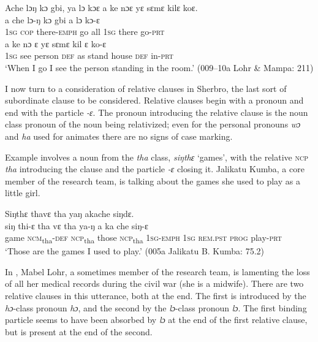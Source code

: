 \ea%
    \label{ex:236}
    Ache lɔŋ kɔ gbi, ya lɔ kɔɛ a ke nɔɛ yɛ sɛmɛ kilɛ koɛ.\\
    \gll a    che  lɔ-ŋ        kɔ     gbi    a    lɔ    kɔ-ɛ\\
    1\textsc{sg}  \textsc{cop}  there{}-\textsc{emph}    go    all      \textsc{1sg}  there  go-\textsc{prt}\\
    \gll a    ke    nɔ      ɛ    yɛ    sɛmɛ    kil      ɛ    ko-ɛ\\
    \textsc{1sg}  see  person  \textsc{def}  as    stand    house    \textsc{def}  in-\textsc{prt}\\
    \glt ‘When I go I see the person standing in the room.' (009--10a Lohr \& Mampa: 211)
\z

I now turn to a consideration of relative clauses in Sherbro, the last sort of subordinate clause to be considered. Relative clauses begin with a pronoun and end with the particle \textit{{}-ɛ}. The pronoun introducing the relative clause is the noun class pronoun of the noun being relativized; even for the personal pronouns \textit{wɔ} and \textit{ha} used for animates there are no signs of case marking.

Example  involves a noun from the \textit{tha} class, \textit{siŋthɛ} ‘games', with the relative \textsc{ncp} \textit{tha} introducing the clause and the particle \textit{{}-ɛ} closing it. Jalikatu Kumba, a core member of the research team, is talking about the games she used to play as a little girl.

\ea%
    \label{ex:237}
    Siŋthɛ thavɛ tha yaŋ   akache siŋdɛ.\\
    \gll siŋ    thi-ɛ      tha    vɛ    tha    ya-ŋ      a    ka      che  siŋ-ɛ\\
    game  \textsc{ncm}\textsubscript{tha}{}-\textsc{def}  \textsc{ncp}\textsubscript{tha}    those  \textsc{ncp}\textsubscript{tha}    \textsc{1sg-emph}  1\textsc{sg}  \textsc{rem.pst}  \textsc{prog}  play\textsc{{}-prt}\\
    \glt ‘Those are the games I used to play.' (005a Jalikatu B. Kumba: 75.2)
\z

In , Mabel Lohr, a sometimes member of the research team, is lamenting the loss of all her medical records during the civil war (she is a midwife). There are two relative clauses in this utterance, both at the end. The first is introduced by the \textit{hɔ}{}-class pronoun \textit{hɔ}, and the second by the \textit{lɔ}{}-class pronoun \textit{lɔ}. The first binding particle seems to have been absorbed by \textit{lɔ} at the end of the first relative clause, but is present at the end of the second.

